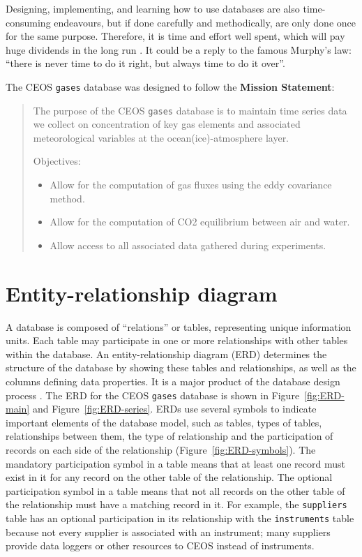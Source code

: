 \documentclass[12pt,letterpaper,titlepage,headings=small,numbers=noenddot]%
{scrartcl}
\begin{document}
Designing, implementing, and learning how to use databases are also
time-consuming endeavours, but if done carefully and methodically, are only
done once for the same purpose.  Therefore, it is time and effort well
spent, which will pay huge dividends in the long run \citep{8781}.  It
could be a reply to the famous Murphy's law: ``there is never time to do it
right, but always time to do it over''.

The CEOS \texttt{gases} database was designed to follow the \textbf{Mission
  Statement}:

\begin{quote}
  The purpose of the CEOS \texttt{gases} database is to maintain time
  series data we collect on concentration of key gas elements and
  associated meteorological variables at the ocean(ice)-atmosphere layer.

  Objectives:

  \begin{itemize}
  \item Allow for the computation of gas fluxes using the eddy covariance
    method.
  \item Allow for the computation of CO2 equilibrium between air and water.
  \item Allow access to all associated data gathered during experiments.
  \end{itemize}

\end{quote}


\section{Entity-relationship diagram}
\label{sec:erd}

A database is composed of ``relations'' or tables, representing unique
information units.  Each table may participate in one or more relationships
with other tables within the database.  An entity-relationship diagram
(ERD) determines the structure of the database by showing these tables and
relationships, as well as the columns defining data properties.  It is a
major product of the database design process \citep{8781}.  The ERD for the
CEOS \texttt{gases} database is shown in Figure~\ref{fig:ERD-main} and
Figure~\ref{fig:ERD-series}.  ERDs use several symbols to indicate
important elements of the database model, such as tables, types of tables,
relationships between them, the type of relationship and the participation
of records on each side of the relationship (Figure~\ref{fig:ERD-symbols}).
The mandatory participation symbol in a table means that at least one
record must exist in it for any record on the other table of the
relationship.  The optional participation symbol in a table means that not
all records on the other table of the relationship must have a matching
record in it.  For example, the \texttt{suppliers} table has an optional
participation in its relationship with the \texttt{instruments} table
because not every supplier is associated with an instrument; many suppliers
provide data loggers or other resources to CEOS instead of instruments.
\end{document}
